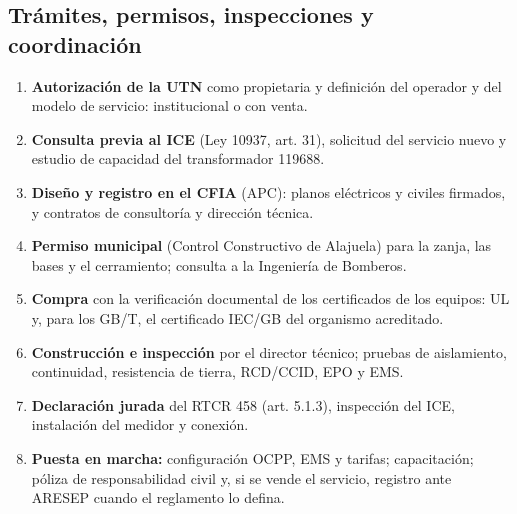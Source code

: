\subsection{Trámites, permisos, inspecciones y coordinación}
\label{sec:tramites}
\begin{enumerate}
\item \textbf{Autorización de la UTN} como propietaria y definición del operador y del modelo de servicio: institucional o con venta.
\item \textbf{Consulta previa al ICE} (Ley 10937, art. 31), solicitud del servicio nuevo y estudio de capacidad del transformador 119688.
\item \textbf{Diseño y registro en el CFIA} (APC): planos eléctricos y civiles firmados, y contratos de consultoría y dirección técnica.
\item \textbf{Permiso municipal} (Control Constructivo de Alajuela) para la zanja, las bases y el cerramiento; consulta a la Ingeniería de Bomberos.
\item \textbf{Compra} con la verificación documental de los certificados de los equipos: UL y, para los GB/T, el certificado IEC/GB del organismo acreditado.
\item \textbf{Construcción e inspección} por el director técnico; pruebas de aislamiento, continuidad, resistencia de tierra, RCD/CCID, EPO y EMS.
\item \textbf{Declaración jurada} del RTCR 458 (art. 5.1.3), inspección del ICE, instalación del medidor y conexión.
\item \textbf{Puesta en marcha:} configuración OCPP, EMS y tarifas; capacitación; póliza de responsabilidad civil y, si se vende el servicio, registro ante ARESEP cuando el reglamento lo defina.
\end{enumerate}

